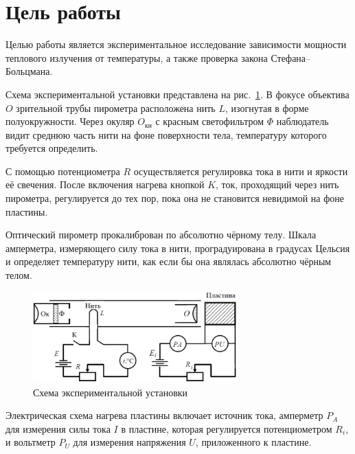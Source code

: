 \section{Цель работы}

Целью работы является экспериментальное исследование зависимости мощности теплового излучения от температуры, а также проверка закона Стефана–Больцмана.

Схема экспериментальной установки представлена на рис.~\ref{fig:setup}. В фокусе объектива \( O \) зрительной трубы пирометра расположена нить \( L \), изогнутая в форме полуокружности. Через окуляр \( O_{\text{ки}} \) с красным светофильтром \( \Phi \) наблюдатель видит среднюю часть нити на фоне поверхности тела, температуру которого требуется определить. 

С помощью потенциометра \( R \) осуществляется регулировка тока в нити и яркости её свечения. После включения нагрева кнопкой \( K \), ток, проходящий через нить пирометра, регулируется до тех пор, пока она не становится невидимой на фоне пластины.

Оптический пирометр прокалиброван по абсолютно чёрному телу. Шкала амперметра, измеряющего силу тока в нити, проградуирована в градусах Цельсия и определяет температуру нити, как если бы она являлась абсолютно чёрным телом.

\begin{figure}[htb]
    \centering
    \includegraphics[width=0.7\textwidth]{images/ExperimentalSetup.png}
    \caption{Схема экспериментальной установки}
    \label{fig:setup}
\end{figure}

Электрическая схема нагрева пластины включает источник тока, амперметр \( P_A \) для измерения силы тока \( I \) в пластине, которая регулируется потенциометром \( R_i \), и вольтметр \( P_U \) для измерения напряжения \( U \), приложенного к пластине.
